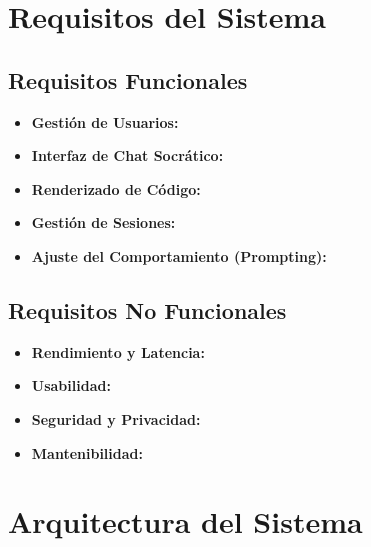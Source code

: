 
\section{Requisitos del Sistema}

\subsection{Requisitos Funcionales}
\begin{itemize}
    \item \textbf{Gestión de Usuarios:} %
    \item \textbf{Interfaz de Chat Socrático:} %
    \item \textbf{Renderizado de Código:} %
    \item \textbf{Gestión de Sesiones:} %
    \item \textbf{Ajuste del Comportamiento (Prompting):} %
\end{itemize}

\subsection{Requisitos No Funcionales}
\begin{itemize}
    \item \textbf{Rendimiento y Latencia:} %
    \item \textbf{Usabilidad:} %
    \item \textbf{Seguridad y Privacidad:} %
    \item \textbf{Mantenibilidad:} %
\end{itemize}


\section{Arquitectura del Sistema}


